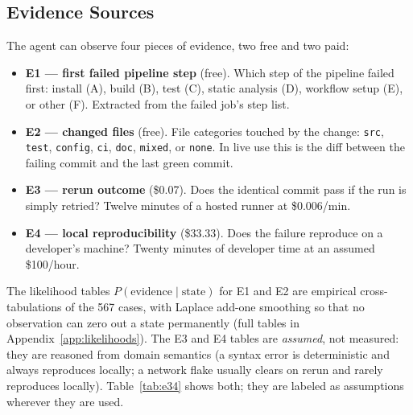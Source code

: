 \documentclass{article}
\begin{document}
\subsection{Evidence Sources}

The agent can observe four pieces of evidence, two free and two paid:

\begin{itemize}
\item \textbf{E1 --- first failed pipeline step} (free). Which step of the pipeline failed first: install (A), build (B), test (C), static analysis (D), workflow setup (E), or other (F). Extracted from the failed job's step list.
\item \textbf{E2 --- changed files} (free). File categories touched by the change: \texttt{src}, \texttt{test}, \texttt{config}, \texttt{ci}, \texttt{doc}, \texttt{mixed}, or \texttt{none}. In live use this is the diff between the failing commit and the last green commit.
\item \textbf{E3 --- rerun outcome} (\$0.07). Does the identical commit pass if the run is simply retried? Twelve minutes of a hosted runner at \$0.006/min.
\item \textbf{E4 --- local reproducibility} (\$33.33). Does the failure reproduce on a developer's machine? Twenty minutes of developer time at an assumed \$100/hour.
\end{itemize}

The likelihood tables $P(\text{evidence} \mid \text{state})$ for E1 and E2 are empirical cross-tabulations of the 567 cases, with Laplace add-one smoothing so that no observation can zero out a state permanently (full tables in Appendix~\ref{app:likelihoods}). The E3 and E4 tables are \emph{assumed}, not measured: they are reasoned from domain semantics (a syntax error is deterministic and always reproduces locally; a network flake usually clears on rerun and rarely reproduces locally). Table~\ref{tab:e34} shows both; they are labeled as assumptions wherever they are used.
\end{document}
